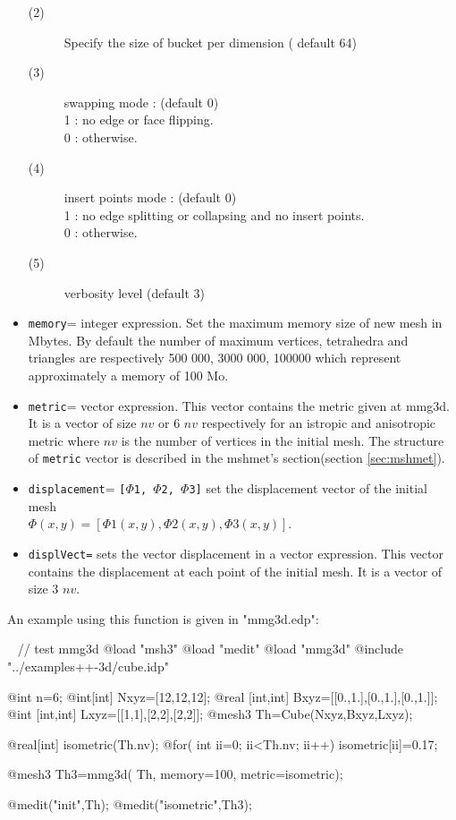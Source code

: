 \documentclass[a4paper,twoside,12pt]{book}
\begin{document}
\begin{itemize}
\begin{description}
\item[(2)] Specify the size of bucket per dimension ( default 64)

\item[(3)] swapping mode : (default 0)\\
		\hspace*{0.3cm} 1 : no edge or face flipping. \\
		\hspace*{0.3cm} 0 : otherwise.

\item[(4)] insert points mode : (default 0)\\
		\hspace*{0.3cm} 1 : no edge splitting or collapsing and no insert points. \\
		\hspace*{0.3cm} 0 : otherwise.		
		
\item[(5)] verbosity level (default 3)
\end{description}
\item \texttt{memory}= integer expression. Set the maximum memory size of new mesh in Mbytes. By default the number of maximum vertices, tetrahedra and triangles are respectively 500 000,  3000 000, 100000 which represent approximately a memory of 100 Mo.
\item \texttt{metric}= vector expression. This vector contains the metric given at mmg3d. It is a vector of size $nv$ or 6 $nv$ respectively for an istropic and anisotropic metric where $nv$ is the number of vertices in the initial mesh. The structure of \texttt{metric} vector is described in the mshmet's section(section \ref{sec:mshmet}).
\item \texttt{displacement}= \texttt{[$\Phi$1, $\Phi$2, $\Phi$3]} set the displacement vector of the initial mesh \\
$\Phi(x,y) = [\Phi1(x,y), \Phi2(x,y), \Phi3(x,y) ]$.
\item \texttt{displVect=} sets the vector displacement in a vector expression. This vector contains the displacement at each point of the initial mesh. It is a vector of size 3 $nv$.
\end{itemize}

An example using this function is given in "mmg3d.edp":
\begin{example}
\label{mmg3dsimple}~
\bFF
// test mmg3d
@load "msh3"
@load "medit"
@load "mmg3d"
@include "../examples++-3d/cube.idp"

@int n=6;
@int[int]  Nxyz=[12,12,12];
@real [int,int]  Bxyz=[[0.,1.],[0.,1.],[0.,1.]];
@int [int,int]  Lxyz=[[1,1],[2,2],[2,2]];
@mesh3 Th=Cube(Nxyz,Bxyz,Lxyz);

@real[int] isometric(Th.nv);{
  @for( int ii=0; ii<Th.nv; ii++)
    isometric[ii]=0.17;
}

@mesh3 Th3=mmg3d(  Th,  memory=100, metric=isometric);
				
@medit("init",Th);
@medit("isometric",Th3);
\eFF
\end{example}
\end{document}
